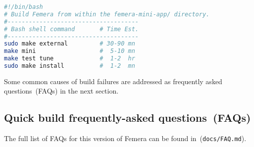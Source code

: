 \begin{center}
\begin{lstlisting}[caption={Build and install Femera in system directories.},
label={lis:quick-start-sys},language=bash,float=ht]
#!/bin/bash
# Build Femera from within the femera-mini-app/ directory.
#-------------------------------------
# Bash shell command       # Time Est.
#-------------------------------------
sudo make external         # 30-90 mn
make mini                  #  5-10 mn
make test tune             #  1-2  hr
sudo make install          #  1-2  mn
\end{lstlisting}
\begin{comment}
tdd:tests/pre-build/quick\_start\_user\_sys\_listings\_is\_same\_with\_sudo\_lines.py
\end{comment}
\end{center}

Some common causes of build failures are addressed as frequently asked
questions~(FAQs) in the next section.

\subsection{Quick build frequently-asked questions~(FAQs)\label{subsec:Quick-faqs}}

The full list of FAQs for this version of Femera can be found
in~(\texttt{docs/FAQ.md}).
\begin{comment} or at
(\texttt{https://github.com/waggyz/femera-mini-app/docs/FAQ.md}).
\end{comment}
\begin{comment}
tdd:tests/pre-build/quick\_start\_faqs\_are\_in\_docs\_FAQ\_file.py
\end{comment}

